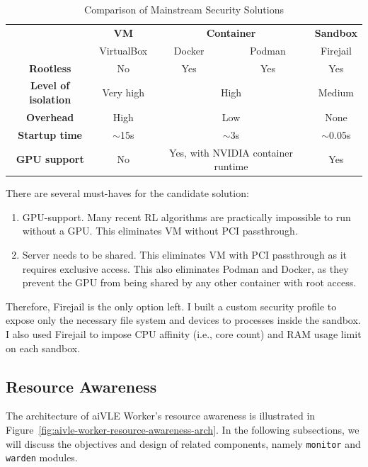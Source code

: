 \begin{table}[H]
\centering
\begin{tabular}{|c|c|cc|c|}
\hline
\multirow{2}{*}{} & \textbf{VM} & \multicolumn{2}{c|}{\textbf{Container}} & \textbf{Sandbox} \\ \cline{2-5} 
 & VirtualBox & \multicolumn{1}{c|}{Docker} & Podman & Firejail \\ \hline
\textbf{Rootless} & No & \multicolumn{1}{c|}{Yes} & Yes & Yes \\ \hline
\textbf{Level of isolation} & Very high & \multicolumn{2}{c|}{High} & Medium \\ \hline
\textbf{Overhead} & High & \multicolumn{2}{c|}{Low} & None \\ \hline
\textbf{Startup time} & $\sim$15s & \multicolumn{2}{c|}{$\sim$3s} & $\sim$0.05s \\ \hline
\textbf{GPU support} & No & \multicolumn{2}{c|}{Yes, with NVIDIA container runtime} & Yes \\ \hline
\end{tabular}
\caption{Comparison of Mainstream Security Solutions}
\label{tab:security-solutions}
\end{table}

There are several must-haves for the candidate solution:

\begin{enumerate}
    \item GPU-support. Many recent RL algorithms are practically impossible to run without a GPU. This eliminates VM without PCI passthrough.
    \item Server needs to be shared. This eliminates VM with PCI passthrough as it requires exclusive access. This also eliminates Podman and Docker, as they prevent the GPU from being shared by any other container with root access.
\end{enumerate}

Therefore, Firejail is the only option left. I built a custom security profile to expose only the necessary file system and devices to processes inside the sandbox. I also used Firejail to impose CPU affinity (i.e., core count) and RAM usage limit on each sandbox.

\subsection{Resource Awareness}
\label{ss:aivle-worker-resource-awareness}
The architecture of aiVLE Worker's resource awareness is illustrated in Figure~\ref{fig:aivle-worker-resource-awareness-arch}. In the following subsections, we will discuss the objectives and design of related components, namely \texttt{monitor} and \texttt{warden} modules.

